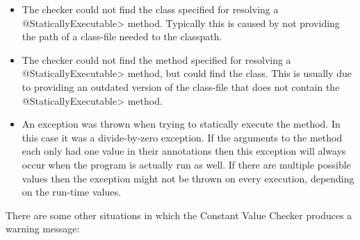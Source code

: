 \begin{sloppypar}
\begin{itemize}
\item {}

  The checker could not find the class
  specified for resolving a \<@StaticallyExecutable> method. Typically
  this is caused by not providing the path of a class-file needed to
  the classpath.

\item {}

  The checker could not find the method  specified for
  resolving a \<@StaticallyExecutable> method, but could find the
  class. This is usually due to providing an outdated version of the
  class-file that does not contain the \<@StaticallyExecutable>
  method.

\item {}

  An exception was thrown when trying to statically execute the
  method. In this case it was a divide-by-zero exception. If the
  arguments to the method each only had one value in their annotations
  then this exception will always occur when the program is actually
  run as well. If there are multiple possible values then the exception
  might not be thrown on every execution, depending on the run-time values.

\end{itemize}
\end{sloppypar}

There are some other situations in which the Constant Value Checker produces a
warning message:

